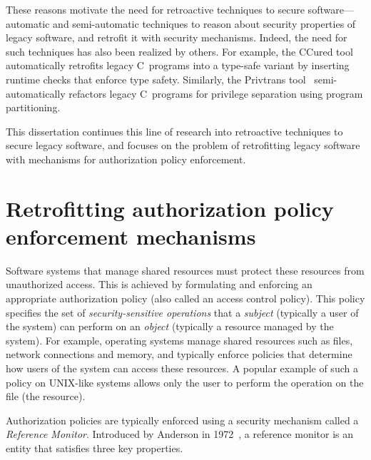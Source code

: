 These reasons motivate the need for retroactive techniques to secure
software---automatic and semi-automatic techniques to reason about security
properties of legacy software, and retrofit it with security mechanisms.
Indeed, the need for such techniques has also been realized by others. For
example, the CCured tool~\cite{nch+05,nmw02} automatically retrofits legacy
C~programs into a type-safe variant by inserting runtime checks that enforce
type safety. Similarly, the Privtrans tool~\cite{bs04} semi-automatically
refactors legacy C~programs for privilege separation using program
partitioning.

This dissertation continues this line of research into retroactive techniques
to secure legacy software, and focuses on the problem of retrofitting legacy
software with mechanisms for authorization policy enforcement.


\section{Retrofitting authorization policy enforcement mechanisms}
\label{chapter:introduction:retrofitting}

Software systems that manage shared resources must protect these resources from
unauthorized access. This is achieved by formulating and enforcing an
appropriate authorization policy (also called an access control policy).  This
policy specifies the set of \textit{security-sensitive operations} that a
\textit{subject} (typically a user of the system) can perform on an
\textit{object} (typically a resource managed by the system).  For example,
operating systems manage shared resources such as files, network connections
and memory, and typically enforce policies that determine how users of the
system can access these resources. A popular example of such a policy on
UNIX-like systems allows only the  user to perform the operation
 on the  file (the resource).

Authorization policies are typically enforced using a security mechanism called
a \textit{Reference Monitor}. Introduced by Anderson in 1972~\cite{a72}, a
reference monitor is an entity that satisfies three key properties.

